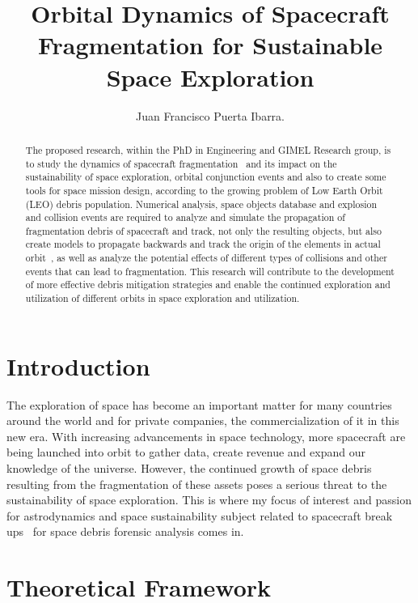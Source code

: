 \documentclass[11pt]{article} %
\title{Orbital Dynamics of Spacecraft Fragmentation for Sustainable Space Exploration}
\author{Juan Francisco Puerta Ibarra.}
\date{}
\begin{document}
\maketitle

\begin{abstract}
The proposed research, within the PhD in Engineering and GIMEL Research group, is to study the dynamics of spacecraft fragmentation~\cite{mains2022impact} and its impact on the sustainability of space exploration, orbital conjunction events and also to create some tools for space mission design, according to the growing problem of Low Earth Orbit (LEO) debris population. Numerical analysis, space objects database and explosion and collision events are required to analyze and simulate the propagation of fragmentation debris of spacecraft and track, not only the resulting objects, but also create models to propagate backwards and track the origin of the elements in actual orbit~\cite{setty2016application}, as well as analyze the potential effects of different types of collisions and other events that can lead to fragmentation. This research will contribute to the development of more effective debris mitigation strategies and enable the continued exploration and utilization of different orbits in space exploration and utilization.
\end{abstract}

\section{Introduction}

The exploration of space has become an important matter for many countries around the world and for private companies, the commercialization of it in this new era. With increasing advancements in space technology, more spacecraft are being launched into orbit to gather data, create revenue and expand our knowledge of the universe. However, the continued growth of space debris resulting from the fragmentation of these assets poses a serious threat to the sustainability of space exploration. This is where my focus of interest and passion for astrodynamics and space sustainability subject related to spacecraft break ups~\cite{limonta2021fragmentation} for space debris forensic analysis comes in.

\section{Theoretical Framework}
\end{document}
